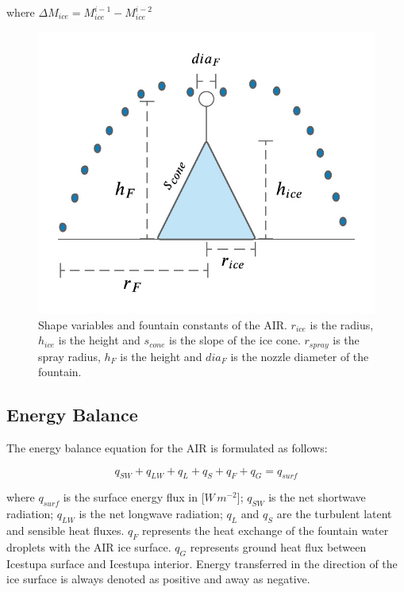 \documentclass[utf8]{frontiersSCNS} %
\begin{document}
where $\Delta M_{ice} = M_{ice}^{i-1} - M_{ice}^{i-2}$

    \begin{figure} \begin{center} \includegraphics[width=10
cm]{Figures/Figure_5.jpg} \end{center} \caption{Shape variables and fountain constants of the AIR. $r_{ice}$ is
the radius, $h_{ice}$ is the height and $s_{cone}$ is the slope of the ice cone. $r_{spray}$ is the spray radius, $h_F$ is the
height and $dia_F$ is the nozzle diameter of the fountain.} \label{fig:shape} \end{figure}

\subsection{Energy Balance} \label{section:EB}

The energy balance equation \citep{Hock_2005} for the AIR is formulated as follows:

\begin{equation} q_{SW} + q_{LW} + q_{L} + q_{S} + q_{F} + q_{G} = q_{surf} \label{eqn:EB} \end{equation}

where $q_{surf}$ is the surface energy flux in [$W\,m^{-2}$]; $q_{SW}$ is the net shortwave radiation; $q_{LW}$ is the
net longwave radiation; $q_{L}$ and $q_{S}$ are the turbulent latent and sensible heat fluxes. $q_{F}$ represents the heat
exchange of the fountain water droplets with the AIR ice surface. $q_{G}$ represents ground heat flux between Icestupa
surface and Icestupa interior. Energy transferred in the direction of the ice surface is always denoted as positive and
away as negative.  
\end{document}
